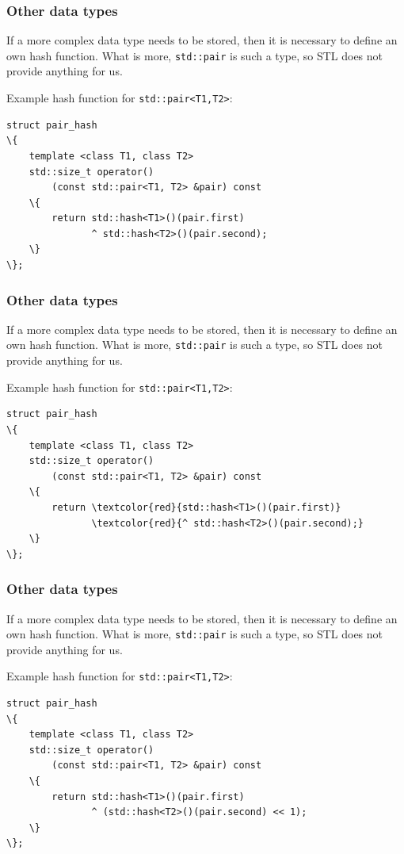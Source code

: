 \documentclass{beamer}
\begin{document}
\begin{frame}[fragile]
    \frametitle{Other data types}

    If a more complex data type needs to be stored, then it is necessary
    to define an own hash function. \pause What is more, \texttt{std::pair}
    is such a type, so STL does not provide anything for us. \pause

    Example hash function for \texttt{std::pair<T1,T2>}:
    \begin{Verbatim}[commandchars=\\\{\},fontsize=\small]
struct pair_hash
\{
    template <class T1, class T2>
    std::size_t operator()
        (const std::pair<T1, T2> &pair) const
    \{
        return std::hash<T1>()(pair.first)
               ^ std::hash<T2>()(pair.second);
    \}
\};
\end{Verbatim}
\end{frame}

\begin{frame}[fragile]
    \frametitle{Other data types}

    If a more complex data type needs to be stored, then it is necessary
    to define an own hash function. What is more, \texttt{std::pair}
    is such a type, so STL does not provide anything for us.

    Example hash function for \texttt{std::pair<T1,T2>}:
    \begin{Verbatim}[commandchars=\\\{\},fontsize=\small]
struct pair_hash
\{
    template <class T1, class T2>
    std::size_t operator()
        (const std::pair<T1, T2> &pair) const
    \{
        return \textcolor{red}{std::hash<T1>()(pair.first)}
               \textcolor{red}{^ std::hash<T2>()(pair.second);}
    \}
\};
\end{Verbatim}
\end{frame}

\begin{frame}[fragile]
    \frametitle{Other data types}

    If a more complex data type needs to be stored, then it is necessary
    to define an own hash function. What is more, \texttt{std::pair}
    is such a type, so STL does not provide anything for us.

    Example hash function for \texttt{std::pair<T1,T2>}:
    \begin{Verbatim}[commandchars=\\\{\},fontsize=\small]
struct pair_hash
\{
    template <class T1, class T2>
    std::size_t operator()
        (const std::pair<T1, T2> &pair) const
    \{
        return std::hash<T1>()(pair.first)
               ^ (std::hash<T2>()(pair.second) << 1);
    \}
\};
\end{Verbatim}
\end{frame}
\end{document}
